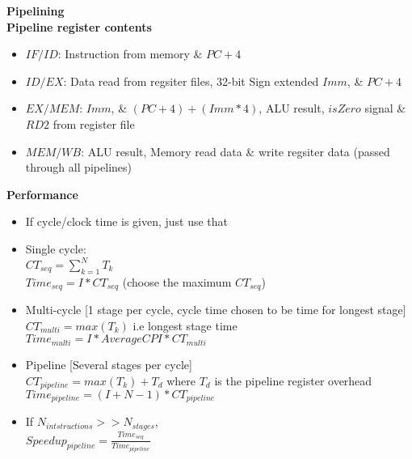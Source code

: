 \documentclass[a4paper]{article} \usepackage[backend=biber, style=numeric, sorting=none]{biblatex}
\begin{document}
\begin{multicols*}{4}
{\small\textbf{Pipelining}}
\\ \textbf{{Pipeline register contents}}
\begin{itemize}[leftmargin=*]
\itemsep -0.5em
\item $IF/ID$: Instruction from memory \& $PC + 4$
\item $ID/EX$: Data read from regsiter files, 32-bit Sign extended $Imm$, \& $PC + 4$
\item $EX/MEM$: $Imm$, \& $(PC + 4) + (Imm * 4)$, ALU result, $isZero$ signal \& $RD2$ from register file
\item $MEM/WB$: ALU result, Memory read data \& write regsiter data (passed through all pipelines)
\end{itemize}

\textbf{{Performance}}
\begin{itemize}[leftmargin=*]
\itemsep -0.3em
\item If cycle/clock time is given, just use that 
\item Single cycle: 
    \\ $CT_{seq} = \sum^N_{k=1}T_k$
    \\ $Time_{seq}  = I * CT_{seq}$ (choose the maximum $CT_{seq}$)
\item Multi-cycle [1 stage per cycle, cycle time chosen to be time for longest stage]
    \\ $CT_{multi} = max(T_k)$ i.e longest stage time
    \\ $Time_{multi} = I * Average CPI * CT_{multi}$ 
\item Pipeline [Several stages per cycle]
    \\ $CT_{pipeline} = max(T_k) + T_d$ where $T_d$ is the pipeline register overhead 
    \\ $Time_{pipeline} = (I + N - 1) * CT_{pipeline}$ 
\item If $N_{intstructions} >> N_{stages}$, 
    \\ $Speedup_{pipeline} = \frac{Time_{seq}}{Time_{pipeline}}$
\end{itemize}


\end{multicols*}
\end{document}
